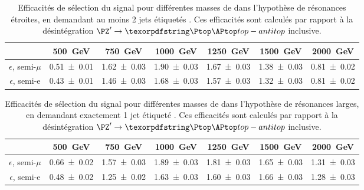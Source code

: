 \begin{table}[p] \centering
  \begin{tabular}{ccccccc} \toprule
    & \SI{500}{\GeV} & \SI{750}{\GeV} & \SI{1000}{\GeV} & \SI{1250}{\GeV} & \SI{1500}{\GeV} & \SI{2000}{\GeV} \\ \midrule
    $\epsilon$, semi-$\mu$ & \num{0.51 \pm 0.01} & \num{1.62 \pm 0.03} & \num{1.90 \pm 0.03} & \num{1.67 \pm 0.03} & \num{1.38 \pm 0.03} & \num{0.81 \pm 0.02} \\
    $\epsilon$, semi-e & \num{0.43 \pm 0.01} & \num{1.46 \pm 0.03} & \num{1.68 \pm 0.03} & \num{1.57 \pm 0.03} & \num{1.32 \pm 0.03} & \num{0.81 \pm 0.02} \\ \bottomrule
  \end{tabular}
  \caption{Efficacités de sélection du signal pour différentes masses de \zprime dans l'hypothèse de résonances étroites, en demandant au moins 2 jets étiquetés \Pbottom. Ces efficacités sont calculés par rapport à la désintégration $\zprime \rightarrow \ttbar$ inclusive.}
  \label{tab:eff_narrow_2b}
\end{table}

\begin{table}[p] \centering
  \begin{tabular}{ccccccc} \toprule
    & \SI{500}{\GeV} & \SI{750}{\GeV} & \SI{1000}{\GeV} & \SI{1250}{\GeV} & \SI{1500}{\GeV} & \SI{2000}{\GeV} \\ \midrule
    $\epsilon$, semi-$\mu$ & \num{0.66 \pm 0.02} & \num{1.57 \pm 0.03} & \num{1.89 \pm 0.03} & \num{1.81 \pm 0.03} & \num{1.65 \pm 0.03} & \num{1.31 \pm 0.03} \\
    $\epsilon$, semi-e & \num{0.48 \pm 0.02} & \num{1.25 \pm 0.02} & \num{1.63 \pm 0.03} & \num{1.60 \pm 0.03} & \num{1.66 \pm 0.03} & \num{1.28 \pm 0.03} \\ \bottomrule
  \end{tabular}
  \caption{Efficacités de sélection du signal pour différentes masses de \zprime dans l'hypothèse de résonances larges, en demandant exactement 1 jet étiqueté \Pbottom. Ces efficacités sont calculés par rapport à la désintégration $\zprime \rightarrow \ttbar$ inclusive.}
  \label{tab:eff_large_1b}
\end{table}

